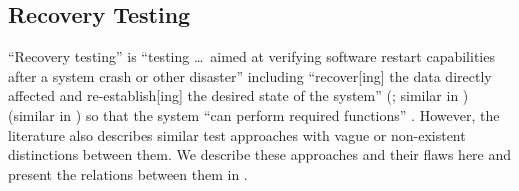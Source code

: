\subsection{Recovery Testing}\label{recov-flaw}

``Recovery testing'' is ``testing \dots\ aimed at verifying
software restart capabilities after a system crash or other disaster''
\citep[p.~5\=/9]{SWEBOK2024} including ``recover[ing] the data directly affected
and re-establish[ing] the desired state of the system'' \ifnotpaper
    (\citealp{ISO_IEC2023a}; similar in \citealp[p.~7\=/10]{SWEBOK2024})
\else \cite{ISO_IEC2023a} (similar in \cite[p.~7\=/10]{SWEBOK2024}) \fi
so that the system ``can perform required functions'' \citep[p.~370]{IEEE2017}.
However, the literature also describes similar test approaches with vague or
non-existent distinctions between them. We describe these approaches and their
flaws here and present the relations between them in .

\NewDocumentCommand{}


